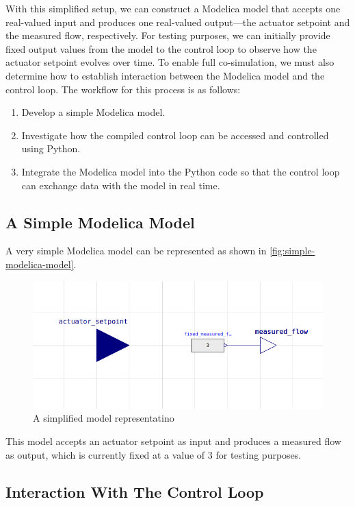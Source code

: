 \documentclass[we,final,11pt,oneside,openany]{uantwerpenbamathesis}
\begin{document}
With this simplified setup, we can construct a Modelica model that accepts one real-valued input and produces one real-valued output—the actuator setpoint and the measured flow, respectively.
For testing purposes, we can initially provide fixed output values from the model to the control loop to observe how the actuator setpoint evolves over time.
To enable full co-simulation, we must also determine how to establish interaction between the Modelica model and the control loop.
The workflow for this process is as follows:
\begin{enumerate}
    \item Develop a simple Modelica model.
    \item Investigate how the compiled control loop can be accessed and controlled using Python.
    \item Integrate the Modelica model into the Python code so that the control loop can exchange data with the model in real time.
\end{enumerate}

\subsection{A Simple Modelica Model}
\label{subsec:a-simple-modelica-model}

A very simple Modelica model can be represented as shown in \autoref{fig:simple-modelica-model}.
\begin{figure}[h!]
    \centering
    \includegraphics[width=0.6\linewidth]{Images/modelica/simple-representation}
    \caption{A simplified model representatino}
    \label{fig:simple-modelica-model}
\end{figure}

This model accepts an actuator setpoint as input and produces a measured flow as output, which is currently fixed at a value of 3 for testing purposes.

\subsection{Interaction With The Control Loop}
\label{subsec:interaction-with-the-control-loop}
\end{document}
